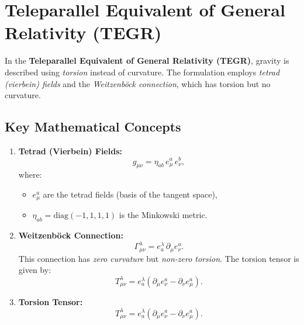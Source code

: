 \documentclass{article}
\begin{document}
\section*{Teleparallel Equivalent of General Relativity (TEGR)}

In the \textbf{Teleparallel Equivalent of General Relativity (TEGR)}, gravity is described using \textit{torsion} instead of curvature. The formulation employs \textit{tetrad (vierbein) fields} and the \textit{Weitzenböck connection}, which has torsion but no curvature.

\subsection*{Key Mathematical Concepts}

\begin{enumerate}
    \item \textbf{Tetrad (Vierbein) Fields:}
    \begin{equation}
        g_{\mu\nu} = \eta_{ab} \, e^a_\mu \, e^b_\nu,
    \end{equation}
    where:
    \begin{itemize}
        \item $e^a_\mu$ are the tetrad fields (basis of the tangent space),
        \item $\eta_{ab} = \text{diag}(-1, 1, 1, 1)$ is the Minkowski metric.
    \end{itemize}

    \item \textbf{Weitzenböck Connection:}
    \begin{equation}
        \Gamma^\lambda_{\mu\nu} = e_a^\lambda \, \partial_\mu e^a_\nu.
    \end{equation}
    This connection has \textit{zero curvature} but \textit{non-zero torsion}. The torsion tensor is given by:
    \begin{equation}
        T^\lambda_{\mu\nu} = e_a^\lambda (\partial_\mu e^a_\nu - \partial_\nu e^a_\mu).
    \end{equation}

    \item \textbf{Torsion Tensor:}
    \begin{equation}
        T^\lambda_{\mu\nu} = e_a^\lambda (\partial_\mu e^a_\nu - \partial_\nu e^a_\mu).
    \end{equation}


\end{enumerate}
\end{document}

